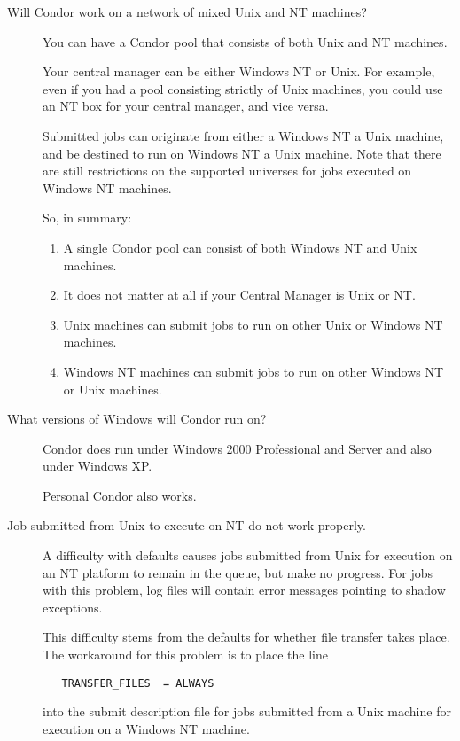 \begin{description}
\item[Will Condor work on a network of mixed Unix and NT machines?]

You can have a Condor pool that consists of both Unix and NT machines.

Your central manager can be either Windows NT or Unix.  For example,
even if you had a pool consisting strictly of Unix machines, you could
use an NT box for your central manager, and vice versa.

Submitted jobs can originate from either a 
Windows NT  a Unix machine,
and be destined to run on Windows NT 
 a Unix machine.
Note that there are still restrictions on the supported universes
for jobs executed on Windows NT machines.

So, in summary:

\begin{enumerate}

\item{A single Condor pool can consist of both Windows NT and Unix
machines.}

\item{It does not matter at all if your Central Manager is Unix or NT.}

\item{Unix machines can submit jobs to run on other Unix or Windows NT
machines.}

\item{Windows NT machines can submit jobs to run on other Windows
NT or Unix machines.}

\end{enumerate}


\item[What versions of Windows will Condor run on?]

Condor does run under Windows 2000 Professional and Server and
also under Windows XP.

Personal Condor also works.


\item[Job submitted from Unix to execute on NT do not work properly.]

A difficulty with defaults causes jobs submitted from Unix for execution
on an NT platform to remain in the queue, but make no progress.
For jobs with this problem, log files will contain error messages
pointing to shadow exceptions.

This difficulty stems from the defaults for whether file transfer
takes place.
The workaround for this problem is to place the line
\begin{verbatim}
   TRANSFER_FILES  = ALWAYS
\end{verbatim}
into the submit description file for jobs submitted from a Unix
machine for execution on a Windows NT machine.



\end{description}
